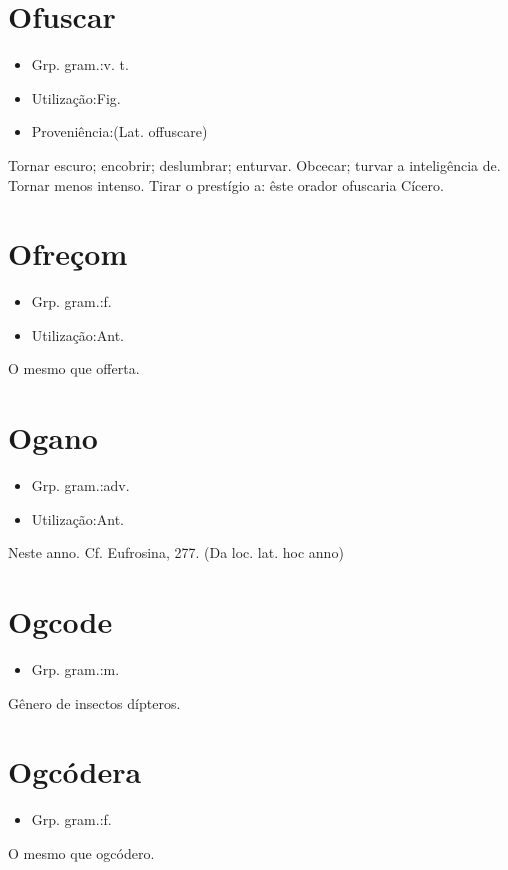 \section{Ofuscar}
\begin{itemize}
\item {Grp. gram.:v. t.}
\end{itemize}
\begin{itemize}
\item {Utilização:Fig.}
\end{itemize}
\begin{itemize}
\item {Proveniência:(Lat. \textunderscore offuscare\textunderscore )}
\end{itemize}
Tornar escuro; encobrir; deslumbrar; enturvar.
Obcecar; turvar a inteligência de.
Tornar menos intenso.
Tirar o prestígio a: \textunderscore êste orador ofuscaria Cícero\textunderscore .
\section{Ofreçom}
\begin{itemize}
\item {Grp. gram.:f.}
\end{itemize}
\begin{itemize}
\item {Utilização:Ant.}
\end{itemize}
O mesmo que \textunderscore offerta\textunderscore .
\section{Ogano}
\begin{itemize}
\item {Grp. gram.:adv.}
\end{itemize}
\begin{itemize}
\item {Utilização:Ant.}
\end{itemize}
Neste anno. Cf. \textunderscore Eufrosina\textunderscore , 277.
(Da loc. lat. \textunderscore hoc anno\textunderscore )
\section{Ogcode}
\begin{itemize}
\item {Grp. gram.:m.}
\end{itemize}
Gênero de insectos dípteros.
\section{Ogcódera}
\begin{itemize}
\item {Grp. gram.:f.}
\end{itemize}
O mesmo que \textunderscore ogcódero\textunderscore .
